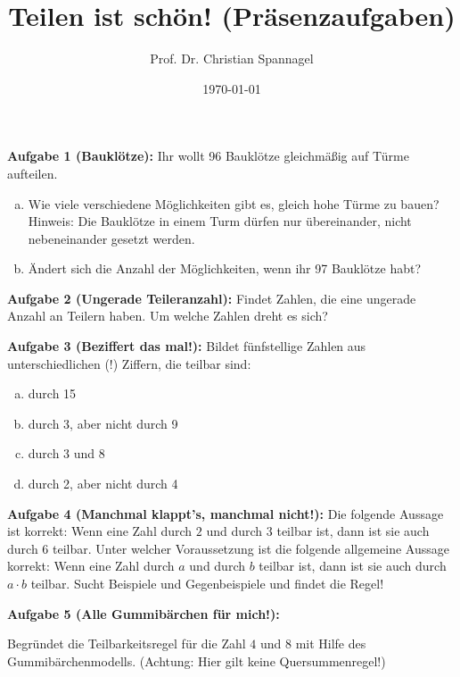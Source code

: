 \documentclass{../cssheet}
\title{Teilen ist schön! (Präsenzaufgaben)}
\author{Prof. Dr. Christian Spannagel}
\date{\today}
\begin{document}
\printtitle

\vspace*{10mm}

\textbf{Aufgabe 1 (Bauklötze):}  Ihr wollt 96 Bauklötze gleichmäßig auf Türme aufteilen.
\begin{enumerate}[a)]
	\item Wie viele verschiedene Möglichkeiten gibt es, gleich hohe Türme zu bauen? Hinweis: Die Bauklötze in einem Turm dürfen nur übereinander, nicht nebeneinander gesetzt werden.
	\item Ändert sich die Anzahl der Möglichkeiten, wenn ihr 97 Bauklötze habt?
\end{enumerate}

\textbf{Aufgabe 2 (Ungerade Teileranzahl):}  Findet Zahlen, die eine ungerade Anzahl an Teilern haben. Um welche Zahlen dreht es sich?

\textbf{Aufgabe 3 (Beziffert das mal!):}  Bildet fünfstellige Zahlen aus unterschiedlichen (!) Ziffern, die teilbar sind:
\begin{enumerate}[a)]
\item durch 15
\item durch 3, aber nicht durch 9
\item durch 3 und 8
\item durch 2, aber nicht durch 4
\end{enumerate}

\textbf{Aufgabe 4 (Manchmal klappt's, manchmal nicht!):} Die folgende Aussage ist korrekt: Wenn eine Zahl durch $2$ und durch $3$ teilbar ist, dann ist sie auch durch $6$ teilbar. Unter welcher Voraussetzung ist die folgende allgemeine Aussage korrekt: Wenn eine Zahl durch $a$ und durch $b$ teilbar ist, dann ist sie auch durch $a\cdot b$ teilbar.
Sucht Beispiele und Gegenbeispiele und findet die Regel!

\textbf{Aufgabe 5 (Alle Gummibärchen für mich!):}  

Begründet die Teilbarkeitsregel für die Zahl $4$ und $8$ mit Hilfe des Gummibärchenmodells. (Achtung: Hier gilt keine Quersummenregel!)


\vspace*{10mm}
\printlicense

\printsocials
\end{document}

